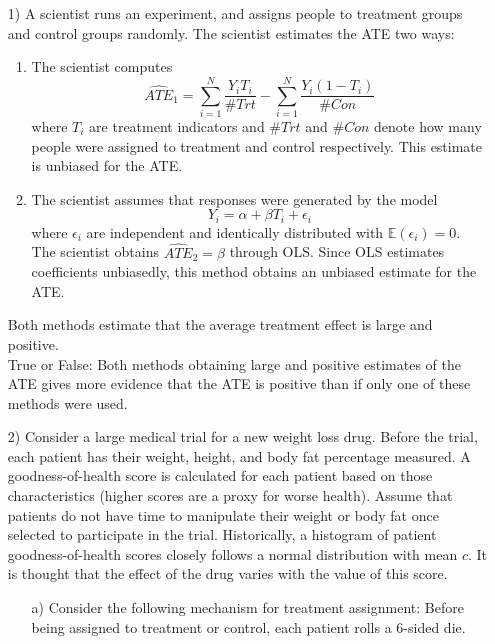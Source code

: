 \documentclass{article}
\newcommand{\E}[0]{\mathbb{E}}
\begin{document}
  \begin{itemize}
    \item[1)]
      A scientist runs an experiment, and assigns people to 
      treatment groups and control groups randomly.
      The scientist estimates the ATE two ways: 
      \begin{enumerate}
        \item The scientist computes
          $$
            \widehat{ATE}_1 = \sum_{i=1}^N \frac{Y_iT_i}{\#Trt} -\sum_{i=1}^N \frac{Y_i(1-T_i)}{\#Con} 
          $$
           where $T_i$ are treatment indicators and 
           $\#Trt$ and $\#Con$ denote how many people were assigned to 
           treatment and control respectively.
           This estimate is unbiased for the ATE.
         \item The scientist assumes that responses were generated by the model
           $$
             Y_i = \alpha + \beta T_i + \epsilon_i
           $$
           where $\epsilon_i$ are independent
           and identically distributed with $\E(\epsilon_i) = 0$.
           The scientist obtains $\widehat{ATE}_2 = \hat\beta $ through OLS.
           Since OLS estimates coefficients unbiasedly, this 
           method obtains an unbiased estimate for the ATE.
      \end{enumerate}
      Both methods estimate that the average treatment effect is large and positive.\\[1ex]
      True or False:  
      Both methods obtaining large and positive estimates of the ATE gives 
      more evidence that the ATE is positive than if
      only one of these methods were used.
    \item[2)]
      Consider a large medical trial for a new weight loss drug.  
      Before the trial, 
      each patient has their weight, height, and body fat percentage measured.
      A goodness-of-health score 
      is calculated for each patient based on those characteristics
      (higher scores are a proxy for worse health).
      Assume that patients do not have time to manipulate their weight or body fat
      once selected to participate in the trial.
      Historically, a histogram of patient goodness-of-health 
      scores closely follows a normal
      distribution with mean $c$.
      It is thought that the effect of the drug varies with the value of this score.
      \begin{itemize}
        \item[a)]  Consider the following mechanism for treatment assignment:
          Before being assigned to treatment or control, each patient rolls a 6-sided die.

\end{itemize}
\end{itemize}
\end{document}
